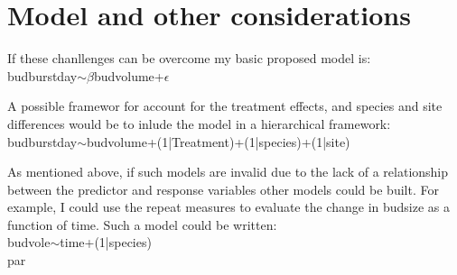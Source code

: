 \documentclass{article}\usepackage[]{graphicx}\usepackage[]{color}
\begin{document}
\section*{Model and other considerations}
\par If these chanllenges can be overcome my basic proposed model is:\\
budburstday$\sim\beta$budvolume+$\epsilon$\par
A possible framewor for account for the treatment effects, and species and site differences would be to inlude the model in a hierarchical framework:\\
budburstday$\sim$budvolume+(1|Treatment)+(1|species)+(1|site)\par
As mentioned above, if such models are invalid due to the lack of a relationship between the predictor and response variables other models could be built. For example, I could use the repeat measures to evaluate the change in budsize as a function of time. Such a model could be written:\\
budvole$\sim$time+(1|species)\\par
\end{document}
